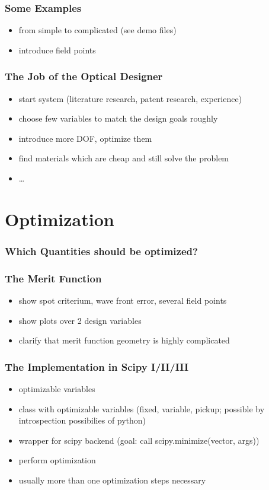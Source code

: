\documentclass[
10pt,
]{beamer}
\begin{document}
\begin{frame}
 \frametitle{Some Examples}
 \begin{itemize}
  \item from simple to complicated (see demo files)
  \item introduce field points
 \end{itemize}

\end{frame}

\begin{frame}
 \frametitle{The Job of the Optical Designer}
 \begin{itemize}
  \item start system (literature research, patent research, experience)
  \item choose few variables to match the design goals roughly
  \item introduce more DOF, optimize them
  \item find materials which are cheap and still solve the problem
  \item \dots
 \end{itemize}
\end{frame}

\section{Optimization}

\begin{frame}
 \frametitle{Which Quantities should be optimized?}
\end{frame}

\begin{frame}
 \frametitle{The Merit Function}
 \begin{itemize}
  \item show spot criterium, wave front error, several field points
  \item show plots over 2 design variables
  \item clarify that merit function geometry is highly complicated
 \end{itemize}
\end{frame}

\begin{frame}
 \frametitle{The Implementation in Scipy I/II/III}
 \begin{itemize}
  \item optimizable variables
  \item class with optimizable variables (fixed, variable, pickup; possible by introspection possibilies of python)
  \item wrapper for scipy backend (goal: call scipy.minimize(vector, args))
  \item perform optimization
  \item usually more than one optimization steps necessary
 \end{itemize}

\end{frame}
\end{document}
